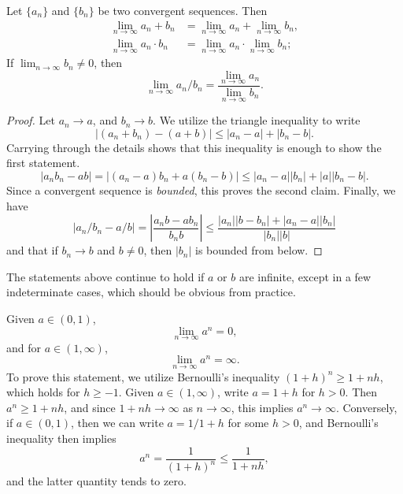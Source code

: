 \begin{lemma}
    Let $\{ a_n \}$ and $\{ b_n \}$ be two convergent sequences. Then
    \begin{align*}
        \lim_{n \to \infty} a_n + b_n &= \lim_{n \to \infty} a_n + \lim_{n \to \infty} b_n,\\
        \lim_{n \to \infty} a_n \cdot b_n &= \lim_{n \to \infty} a_n \cdot \lim_{n \to \infty} b_n;
    \end{align*}
    If $\lim_{n \to \infty} b_n \neq 0$, then
    \[ \lim_{n \to \infty} a_n/b_n = \frac{\lim_{n \to \infty} a_n}{\lim_{n \to \infty} b_n}. \]
\end{lemma}
\begin{proof}
    Let $a_n \to a$, and $b_n \to b$. We utilize the triangle inequality to write
    \[ |(a_n + b_n) - (a + b)| \leq |a_n - a| + |b_n - b|. \]
    Carrying through the details shows that this inequality is enough to show the first statement.
    \[ |a_nb_n - ab| = |(a_n - a)b_n + a(b_n - b)| \leq |a_n - a| |b_n| + |a| |b_n - b|. \]
    Since a convergent sequence is \emph{bounded}, this proves the second claim. Finally, we have
    \[ |a_n/b_n - a/b| = \left| \frac{a_n b - ab_n}{b_n b} \right| \leq \frac{|a_n| |b - b_n| + |a_n - a| |b_n|}{|b_n| |b|} \]
    and that if $b_n \to b$ and $b \neq 0$, then $|b_n|$ is bounded from below.
\end{proof}

The statements above continue to hold if $a$ or $b$ are infinite, except in a few indeterminate cases, which should be obvious from practice.

\begin{example}
    Given $a \in (0,1)$,
    \[ \lim_{n \to \infty} a^n = 0, \]
    and for $a \in (1,\infty)$,
    \[ \lim_{n \to \infty} a^n = \infty. \]
    To prove this statement, we utilize Bernoulli's inequality $(1 + h)^n \geq 1 + nh$, which holds for $h \geq -1$. Given $a \in (1,\infty)$, write $a = 1 + h$ for $h > 0$. Then $a^n \geq 1 + nh$, and since $1 + nh \to \infty$ as $n \to \infty$, this implies $a^n \to \infty$. Conversely, if $a \in (0,1)$, then we can write $a = 1/1 + h$ for some $h > 0$, and Bernoulli's inequality then implies
    \[ a^n = \frac{1}{(1 + h)^n} \leq \frac{1}{1 + nh}, \]
    and the latter quantity tends to zero.
\end{example}

